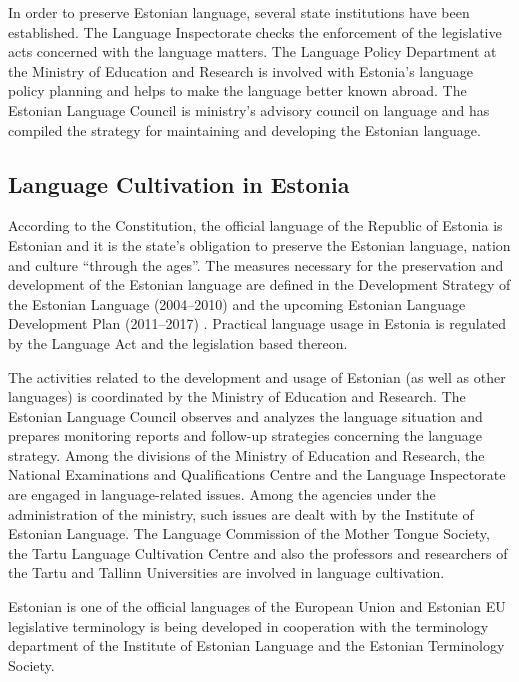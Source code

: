 \documentclass[]{../metanetpaper}
\begin{document}
\begin{multicols}{2}
In order to preserve Estonian language, several state institutions have been established. 
The Language Inspectorate checks the enforcement of the legislative acts concerned with the language matters. 
The Language Policy Department at the Ministry of Education and Research is involved with Estonia's language policy planning and helps to make the language better known abroad. 
The Estonian Language Council is ministry's advisory council on language and has compiled the strategy for maintaining and developing the Estonian language.

\subsection{Language Cultivation in Estonia}

According to the Constitution, the official language of the Republic of Estonia is Estonian and it is the state's obligation to preserve the Estonian language, nation and culture ``through the ages''. 
The measures necessary for the preservation and development of the Estonian language are deﬁned in the Development Strategy of the Estonian Language (2004--2010) \cite{KeeleStratEn} and the upcoming Estonian Language Development Plan (2011--2017) \cite{DevPlan}. 
Practical language usage in Estonia is regulated by the Language Act and the legislation based thereon.


The activities related to the development and usage of Estonian (as well as other languages) is coordinated by the Ministry of Education and Research. 
The Estonian Language Council observes and analyzes the language situation and prepares monitoring reports and follow-up strategies concerning the language strategy. 
Among the divisions of the Ministry of Education and Research, the National Examinations and Qualiﬁcations Centre and the Language Inspectorate are engaged in language-related issues. 
Among the agencies under the administration of the ministry, such issues are dealt with by the Institute of Estonian Language. 
The Language Commission of the Mother Tongue Society, the Tartu Language Cultivation Centre and also the professors and researchers of the Tartu and Tallinn Universities are involved in language cultivation.

Estonian is one of the official languages of the European Union and Estonian EU legislative terminology is being developed in cooperation with the terminology department of the Institute of Estonian Language and the Estonian Terminology Society.


\end{multicols}
\end{document}
